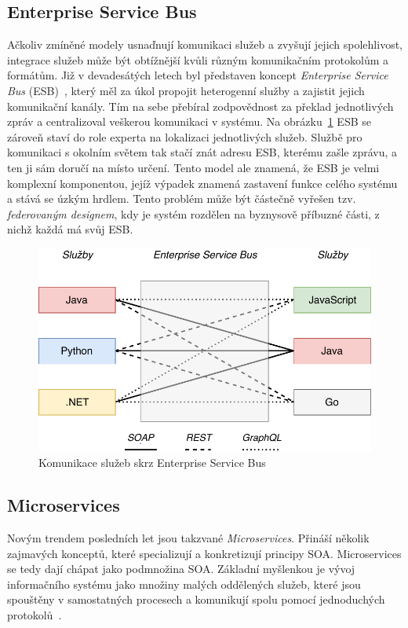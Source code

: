 \subsection{Enterprise Service Bus}

Ačkoliv zmíněné modely usnaďnují komunikaci služeb a zvyšují jejich
spolehlivost, integrace služeb může být obtížnější kvůli různým
komunikačním protokolům a formátům. Již v devadesátých letech
byl představen koncept \textit{Enterprise Service Bus} (ESB)~\cite{chappell2004enterprise},
který měl za úkol propojit heterogenní služby a zajistit jejich
komunikační kanály. Tím na sebe přebíral zodpovědnost za překlad
jednotlivých zpráv a centralizoval veškerou komunikaci v systému.
Na obrázku~\ref{fig:enterprise-service-bus}
ESB se zároveň staví do role experta na lokalizaci jednotlivých služeb.
Službě pro komunikaci s okolním světem tak stačí znát adresu ESB, kterému
zašle zprávu, a ten ji sám doručí na místo určení. Tento model ale
znamená, že ESB je velmi komplexní komponentou, jejíž výpadek
znamená zastavení funkce celého systému a stává se úzkým hrdlem.
Tento problém může být částečně vyřešen tzv. \textit{federovaným designem},
kdy je systém rozdělen na byznysově příbuzné části, z nichž každá má
svůj ESB.

\begin{figure}
    \centering
    \includegraphics[keepaspectratio=true, width=0.8\linewidth]{figures/enterprise-service-bus.pdf}
    \caption{Komunikace služeb skrz Enterprise Service Bus}
    \label{fig:enterprise-service-bus}
\end{figure}

\subsection{Microservices}

Novým trendem posledních let jsou takzvané \textit{Microservices}.
Přináší několik zajmavých konceptů, které specializují a konkretizují
principy SOA. Microservices se tedy dají chápat jako podmnožina
SOA. Základní myšlenkou je vývoj informačního systému jako množiny
malých oddělených služeb, které jsou spouštěny v samostatných procesech
a komunikují spolu pomocí jednoduchých protokolů~\cite{lewis2014microservices}.

